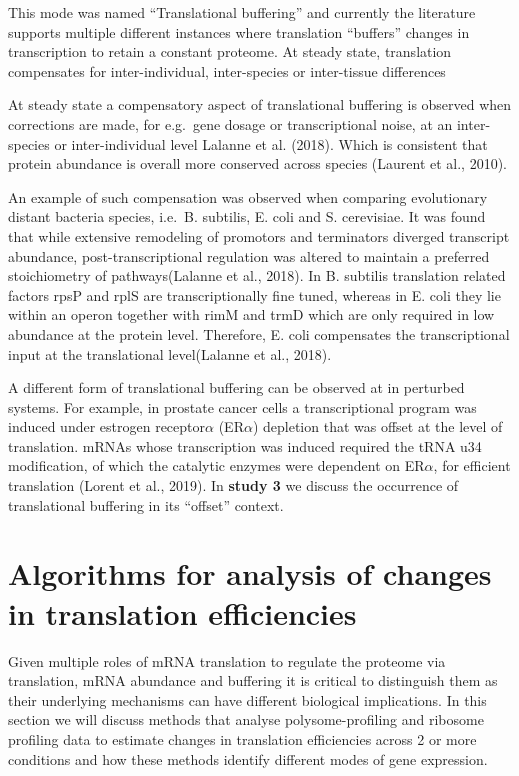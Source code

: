\documentclass[
  12pt,
  openany]{book}
\begin{document}
This mode was named ``Translational buffering'' and currently the literature supports multiple different instances where translation ``buffers'' changes in transcription to retain a constant proteome. At steady state, translation compensates for inter-individual, inter-species or inter-tissue differences

At steady state a compensatory aspect of translational buffering is observed when corrections are made, for e.g.~gene dosage or transcriptional noise, at an inter-species or inter-individual level Lalanne et al. (2018). Which is consistent that protein abundance is overall more conserved across species (Laurent et al., 2010).

An example of such compensation was observed when comparing evolutionary distant bacteria species, i.e.~B. subtilis, E. coli and S. cerevisiae. It was found that while extensive remodeling of promotors and terminators diverged transcript abundance, post-transcriptional regulation was altered to maintain a preferred stoichiometry of pathways(Lalanne et al., 2018). In B. subtilis translation related factors rpsP and rplS are transcriptionally fine tuned, whereas in E. coli they lie within an operon together with rimM and trmD which are only required in low abundance at the protein level. Therefore, E. coli compensates the transcriptional input at the translational level(Lalanne et al., 2018).

A different form of translational buffering can be observed at in perturbed systems. For example, in prostate cancer cells a transcriptional program was induced under estrogen receptor\(\alpha\) (ER\(\alpha\)) depletion that was offset at the level of translation. mRNAs whose transcription was induced required the tRNA u34 modification, of which the catalytic enzymes were dependent on ER\(\alpha\), for efficient translation (Lorent et al., 2019). In \textbf{study 3} we discuss the occurrence of translational buffering in its ``offset'' context.
\newline

\section{Algorithms for analysis of changes in translation efficiencies}\label{algorithm}

Given multiple roles of mRNA translation to regulate the proteome via translation, mRNA abundance and buffering it is critical to distinguish them as their underlying mechanisms can have different biological implications. In this section we will discuss methods that analyse polysome-profiling and ribosome profiling data to estimate changes in translation efficiencies across 2 or more conditions and how these methods identify different modes of gene expression.
\end{document}

